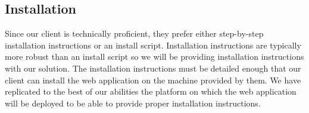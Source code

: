 \subsection{Installation}
Since our client is technically proficient, they prefer either step-by-step installation instructions or an install script. Installation instructions are typically more robust than an install script so we will be providing installation instructions with our solution. The installation instructions must be detailed enough that our client can install the web application on the machine provided by them. We have replicated to the best of our abilities the platform on which the web application will be deployed to be able to provide proper installation instructions.